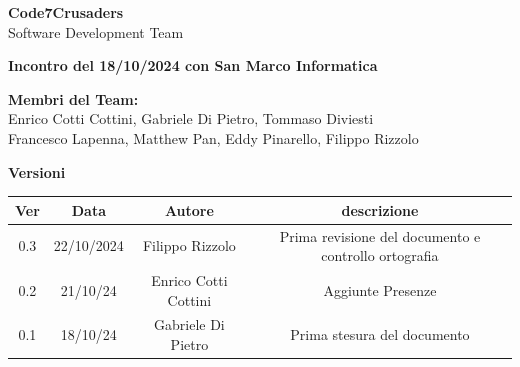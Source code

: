 \documentclass{article}
\begin{document}
\begin{titlepage}
    {\Huge \textbf{Code7Crusaders}}\\
    \vspace{0.5cm}
    {\Large Software Development Team}\\
    \vspace{2cm}
    

    {\large \textbf{Incontro del 18/10/2024 con San Marco Informatica}}\\
    \vspace{5cm}

    \textbf{Membri del Team:}\\
    Enrico Cotti Cottini, Gabriele Di Pietro, Tommaso Diviesti \\
    Francesco Lapenna, Matthew Pan, Eddy Pinarello, Filippo Rizzolo \\
    \vspace{0.5cm}
    
    \vspace{1cm}
\end{titlepage}

\begin{center}
    \textbf{Versioni}
    \\
    \begin{tabular}{|c|c|c|c|}
        \hline
        \textbf{Ver} & \textbf{Data} & \textbf{Autore} & \textbf{descrizione}\\
        \hline
        0.3 & 22/10/2024 & Filippo Rizzolo & Prima revisione del documento e controllo ortografia \\ 
        \hline
	    0.2 & 21/10/24 & Enrico Cotti Cottini & Aggiunte Presenze \\
	    \hline
        0.1 & 18/10/24 & Gabriele Di Pietro & Prima stesura del documento \\
        \hline
    \end{tabular}
\end{center}

\newpage
\tableofcontents
\newpage

\end{document}
